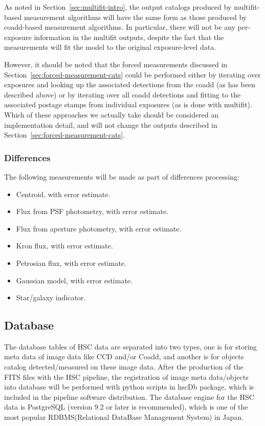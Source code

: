 \documentclass[12pt]{article}
\begin{document}
As noted in Section~\ref{sec:multifit-intro}, the output catalogs
produced by multifit-based measurement algorithms will have the same
form as those produced by coadd-based measurement algorithms.  In
particular, there will not be any per-exposure information in the
multifit outputs, despite the fact that the measurements will fit the
model to the original exposure-level data.

However, it should be noted that the forced measurements discussed in
Section~\ref{sec:forced-measurement-cats} could be performed either by
iterating over exposures and looking up the associated detections from
the coadd (as has been described above) or by iterating over all coadd
detections and fitting to the associated postage stamps from
individual exposures (as is done with multifit).  Which of these
approaches we actually take should be considered an implementation
detail, and will not change the outputs described in
Section~\ref{sec:forced-measurement-cats}.

\subsubsection{Differences}

The following measurements will be made as part of differences processing:
\begin{itemize}
\item Centroid, with error estimate.
\item Flux from PSF photometry, with error estimate.
\item Flux from aperture photometry, with error estimate.
\item Kron flux, with error estimate.
\item Petrosian flux, with error estimate.
\item Gaussian model, with error estimate.
\item Star/galaxy indicator.
\end{itemize}


\subsection{Database}
\label{sec:database}

The database tables of HSC data are separated into two types, one is for storing meta data 
of image data like CCD and/or Coadd, and another is for objects catalog detected/measured 
on these image data. After the production of the FITS files with the HSC pipeline, the 
registration of image meta data/objects into database will be performed with python scripts 
in hscDb package, which is included in the pipeline software distribution. The database engine 
for the HSC data is PostgreSQL (version 9.2 or later is recommended), which is one of the most 
popular RDBMS(Relational DataBase Management System) in Japan.  
\end{document}
